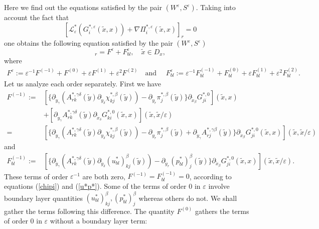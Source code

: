 \documentclass[11pt, reqno]{amsart}
\theoremstyle{definition}
\theoremstyle{remark}
\numberwithin{equation}{section}
\newcommand{\Le}{\mathcal{L}_\varepsilon}
\begin{document}
	\noindent Here
	we find out the equations satisfied by  the pair $(W^{\varepsilon}, S^{\varepsilon}) $.
Taking into account the fact that  	 $$[\Le^*( G_{i}^{*,\varepsilon} (\tilde{x},x)) + \nabla	\Pi_i^{*,\varepsilon} (\tilde{x},x)]_r =0$$ one obtains
	the following  equation satisfied by
	the pair $ (W^{\varepsilon}, S^{\varepsilon}) $
	\begin{equation*}
		[\Le^*(W_i^\varepsilon) +\nabla S_i^\varepsilon]_r	= F^\varepsilon +F_{bl}^{\varepsilon}, \quad   \tilde{x}\in D_x,
	\end{equation*}	
	where	 
	\begin{align*}
		F^\varepsilon:= \varepsilon^{-1} F
		^{(-1)} +F^{(0)}+\varepsilon F^{(1)} + \varepsilon^2 F^{(2)}\quad \mbox{and }\quad
		F^{\varepsilon}_{bl}:= \varepsilon^{-1} F^{(-1)}_{bl} +F^{(0)}_{bl}+\varepsilon F^{(1)}_{bl} + \varepsilon^2 F^{(2)}_{bl}.
	\end{align*}
Let us analyze each order separately. First we have
	\begin{align*}
		F^{(-1)}:=& [\{\partial_{\tilde{y}_\gamma} ( A^{*,\gamma\delta}_{rk}(\tilde{y})\partial_{\tilde{y}_\delta}\chi^{*,\beta}_{kj}(\tilde{y})) -\partial_{\tilde{y}_r}\pi^{*,\beta}_{j}(\tilde{y}) \} \partial_{\tilde{x}_\beta}  G_{ji}^{*,0}] (\tilde{x},x)\\
		&+[ \partial_{\tilde{y}_\gamma}  A^{*,\gamma\delta}_{rk}(\tilde{y})\partial_{\tilde{x}_\delta}  G_{ki}^{*,0} (\tilde{x},x) ]	(\tilde{x},\tilde{x}/\varepsilon)\\
		=& [\{\partial_{\tilde{y}_\gamma} ( A^{*,\gamma\delta}_{rk}(\tilde{y})\partial_{\tilde{y}_\delta}\chi^{*,\beta}_{kj}(\tilde{y})) -\partial_{\tilde{y}_r}\pi^{*,\beta}_{j}(\tilde{y})  
		+ \partial_{\tilde{y}_\gamma}  A^{*,\gamma\beta}_{rj}(\tilde{y}) \}\partial_{\tilde{x}_\beta}  G_{ji}^{*,0} (\tilde{x},x) ]	(\tilde{x},\tilde{x}/\varepsilon)
	\end{align*}
	and 
		\begin{align*}
		F^{(-1)}_{bl}:=& [\{\partial_{\tilde{y}_\gamma} ( A^{*,\gamma\delta}_{rk}(\tilde{y})\partial_{\tilde{y}_\delta}(u^*_{bl})^{\beta}_{kj}(\tilde{y})) -\partial_{\tilde{y}_r}(p_{bl}^*)^{\beta}_{j}(\tilde{y}) \} \partial_{\tilde{x}_\beta}  G_{ji}^{*,0} (\tilde{x},x)]	(\tilde{x},\tilde{x}/\varepsilon).
	\end{align*}
		These terms of order $\varepsilon^{-1}$ are both zero, $	F^{(-1)}=	F^{(-1)}_{bl}=0$, 	according to equations (\ref{chipi}) and (\ref{u*p*}).
	 Some of the terms of order 0 in $\varepsilon$ involve boundary layer quantities $ (u^*_{bl})^{\beta}_{kj}, (p_{bl}^*)^{\beta}_{j}$ whereas others do not. We shall gather the terms following this difference. The quantity $F^{(0)}$ gathers the terms of order $0$ in $\varepsilon$ without a boundary layer term:
\end{document}
